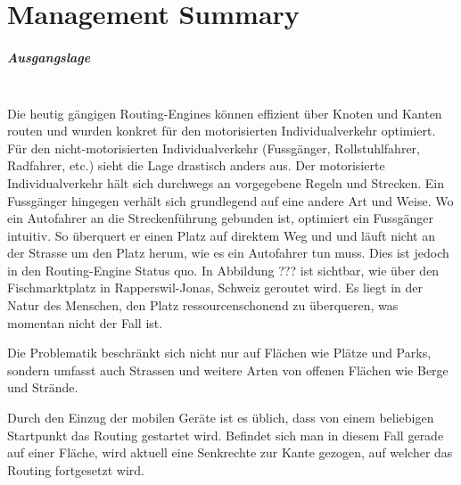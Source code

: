 
\chapter*{Management Summary}



\paragraph{Ausgangslage}~\\
Die heutig gängigen Routing-Engines können effizient über Knoten und Kanten routen und wurden konkret für den motorisierten Individualverkehr optimiert. Für den nicht-motorisierten Individualverkehr (Fussgänger, Rollstuhlfahrer, Radfahrer, etc.) sieht die Lage drastisch anders aus. Der motorisierte Individualverkehr hält sich durchwegs an vorgegebene Regeln und Strecken. Ein Fussgänger hingegen verhält sich grundlegend auf eine andere Art und Weise. Wo ein Autofahrer an die Streckenführung gebunden ist, optimiert ein Fussgänger intuitiv. So überquert er einen Platz auf direktem Weg und und läuft nicht an der Strasse um den Platz herum, wie es ein Autofahrer tun muss. Dies ist jedoch in den Routing-Engine Status quo. In Abbildung ??? ist sichtbar, wie über den Fischmarktplatz in Rapperswil-Jonas, Schweiz geroutet wird. Es liegt in der Natur des Menschen, den Platz ressourcenschonend zu überqueren, was momentan nicht der Fall ist.

Die Problematik beschränkt sich nicht nur auf Flächen wie Plätze und Parks, sondern umfasst auch Strassen und weitere Arten von offenen Flächen wie Berge und Strände.

Durch den Einzug der mobilen Geräte ist es üblich, dass von einem beliebigen Startpunkt das Routing gestartet wird. Befindet sich man in diesem Fall gerade auf einer Fläche, wird aktuell eine Senkrechte zur Kante gezogen, auf welcher das Routing fortgesetzt wird.


